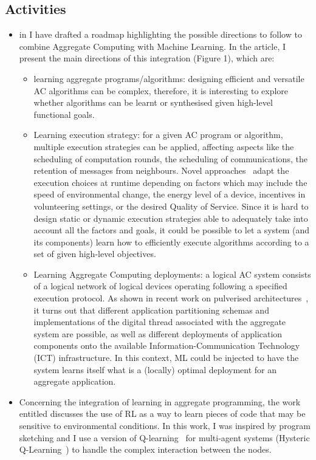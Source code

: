 \documentclass[11pt]{article}
\begin{document}
\subsection{Activities}
\begin{itemize}
	\item in \textit{} I have drafted 
 a roadmap highlighting the possible directions to follow to combine Aggregate Computing with Machine Learning.
%
In the article, I present the main directions of this integration (Figure 1), which are:
\begin{itemize}
	\item learning aggregate programs/algorithms: designing efficient and versatile AC algorithms can be complex, 
	therefore, it is interesting to explore whether algorithms can be learnt or synthesised given high-level functional goals.
	
	\item Learning execution strategy: for a given AC program or algorithm, 
	 multiple execution strategies can be applied, 
	 affecting aspects like the scheduling
	 of computation rounds, 
	 the scheduling of communications, 
	 the retention of messages from neighbours. 
	Novel approaches~\cite{zambonelli2021time} 
	 adapt the execution choices at runtime 
	 depending on factors which may include the speed of environmental change, 
	 the energy level of a device, incentives in volunteering settings, 
	 or the desired Quality of Service.
	Since it is hard to design static
	 or dynamic execution strategies able 
	 to adequately take into account all the factors and goals, 
	 it could be possible to let a system (and its components) 
	 learn how to efficiently execute algorithms according 
	 to a set of given high-level objectives.
	
	\item Learning Aggregate Computing deployments: a logical AC system consists of a logical network of
	 logical devices operating following a specified execution protocol. 
	As shown in recent work on pulverised architectures~\cite{Casadei2020}, 
	 it turns out that different application partitioning schemas and implementations of the digital thread associated 
	 with the aggregate system are possible, 
	 as well as different deployments of application components onto the available Information-Communication Technology (ICT) infrastructure. 
	In this context, ML could be injected to have 
	 the system learns itself what is a (locally) optimal deployment 
	 for an aggregate application.
\end{itemize}
\item Concerning the integration of learning in aggregate programming, the work 
 entitled \textit{} 
 discusses the use of RL as a way to learn pieces of code 
 that may be sensitive to environmental conditions. 
In this work, I was inspired by program sketching 
 and I use a version of Q-learning~\cite{watkins1992q} for multi-agent systems (Hysteric Q-Learning~\cite{matignon2007hysteretic})
 to handle the complex interaction between the nodes. 
 

\end{itemize}
\end{document}
